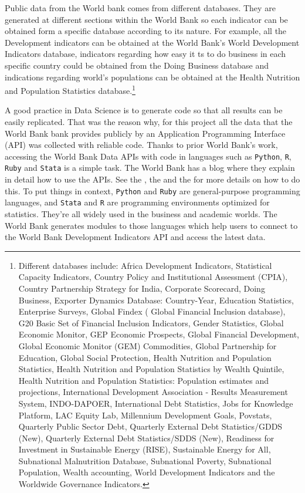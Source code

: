Public data from the World bank comes from different databases. They are generated at different sections within the World Bank so each indicator can be obtained form a specific database according to its nature. For example, all the Development indicators can be obtained at the World Bank's World Development Indicators database, indicators regarding how easy it ts to do business in each specific country could be obtained from the Doing Business database and indications regarding world's populations can be obtained at the Health Nutrition and Population Statistics database.\footnote{Different databases include:
Africa Development Indicators, Statistical Capacity Indicators, Country Policy and Institutional Assessment (CPIA), Country Partnership Strategy for India, Corporate Scorecard, Doing Business, Exporter Dynamics Database: Country-Year, Education Statistics, Enterprise Surveys, Global Findex ( Global Financial Inclusion database), G20 Basic Set of Financial Inclusion Indicators, Gender Statistics, Global Economic Monitor, GEP Economic Prospects, Global Financial Development, Global Economic Monitor (GEM) Commodities, Global Partnership for Education, Global Social Protection, Health Nutrition and Population Statistics, Health Nutrition and Population Statistics by Wealth Quintile, Health Nutrition and Population Statistics: Population estimates and projections, International Development Association - Results Measurement System, INDO-DAPOER, International Debt Statistics, Jobs for Knowledge Platform, LAC Equity Lab, Millennium Development Goals, Povstats, Quarterly Public Sector Debt, Quarterly External Debt Statistics/GDDS (New), Quarterly External Debt Statistics/SDDS (New), Readiness for Investment in Sustainable Energy (RISE), Sustainable Energy for All, Subnational Malnutrition Database, Subnational Poverty, Subnational Population, Wealth accounting, World Development Indicators and the  Worldwide Governance Indicators.}


A good practice in Data Science is to generate code so that all results can be easily replicated. That was the reason why, for this project all the data that the World Bank bank provides publicly by an Application Programming Interface (API) was collected with reliable code. Thanks to prior World Bank's work, accessing the World Bank Data APIs with code in languages such as \texttt{Python}, \texttt{R}, \texttt{Ruby} and \texttt{Stata} is a simple task. The World Bank has a blog where they explain in detail how to use the APIs. See the \cite{wb_api}, the \cite{wb_python} and the \cite{wb_r} for more details on how to do this. To put things in context, \texttt{Python} and \texttt{Ruby} are general-purpose programming languages, and \texttt{Stata} and \texttt{R} are programming environments optimized for statistics. They're all widely used in the business and academic worlds. The World Bank generates modules to those languages which help users to connect to the World Bank Development Indicators API and access the latest data.

